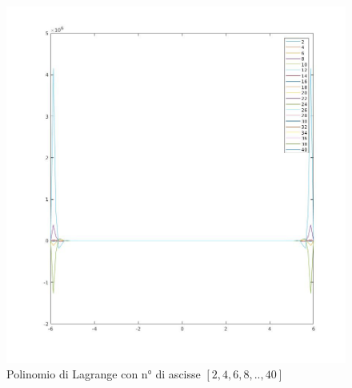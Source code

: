 \begin{figure}[H]
	\label{Cap_4_Es_9(2)}
	\includegraphics[width=\textwidth]{Plot/Cap_4_Es_9(2)}
	\caption{Polinomio di Lagrange con n° di ascisse $[2,4,6,8,..,40]$}
\end{figure}